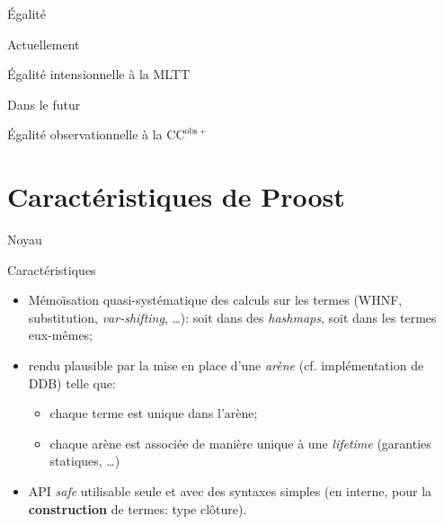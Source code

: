 \documentclass[12pt, aspectratio=169]{beamer}
\begin{document}
        \begin{frame}{Égalité}

            \begin{block}{Actuellement}

                Égalité intensionnelle à la MLTT

            \end{block}

            \vfill
            \pause

            \begin{alertblock}{Dans le futur}

                Égalité observationnelle à la $\mathrm{CC}^{\mathrm{obs}+}$

            \end{alertblock}

        \end{frame}

    \section{Caractéristiques de Proost}

        \begin{frame}{Noyau}

            \begin{block}{Caractéristiques}

                \begin{itemize}
                    \item Mémoïsation quasi-systématique des
                        calculs sur les termes (WHNF, substitution,
                        \textit{var-shifting}, \dots): soit dans des \textit{hashmaps},
                        soit dans les termes eux-mêmes;\pause
                    \item rendu plausible par la mise en place d'une
                        \emph{arène} (cf. implémentation de DDB) telle que: \pause
                    \begin{itemize}
                        \item chaque terme est unique dans l'arène; \pause
                        \item chaque arène est associée de manière unique à une
                            \textit{lifetime} (garanties statiques, \dots) \pause
                    \end{itemize}

                    \item API \textit{safe} utilisable seule et avec des
                        syntaxes simples (en interne, pour la \textbf{construction}
                        de termes: type clôture).
                \end{itemize}

            \end{block}

        \end{frame}
\end{document}
